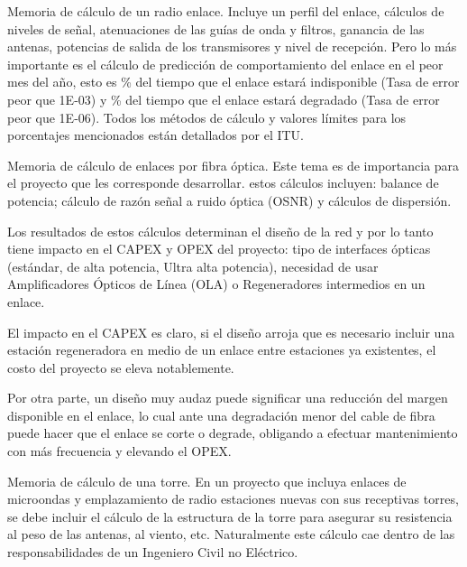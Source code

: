 Memoria de cálculo de un radio enlace. Incluye un perfil del enlace, cálculos de niveles 
de señal, atenuaciones de las guías de onda y filtros, ganancia de las antenas, 
potencias de salida de los transmisores y nivel de recepción. Pero lo más importante es 
el cálculo de predicción de comportamiento del enlace en el peor mes del año, esto es 
\% del tiempo que el enlace estará indisponible (Tasa de error peor que 1E-03) y \% del 
tiempo que el enlace estará degradado (Tasa de error peor que 1E-06). Todos los 
métodos de cálculo y valores límites para los porcentajes mencionados están 
detallados por el ITU. 
 
Memoria de cálculo de enlaces por fibra óptica. Este tema es de importancia para el 
proyecto que les corresponde desarrollar. estos cálculos incluyen: balance de potencia; 
cálculo de razón señal a ruido óptica (OSNR) y cálculos de dispersión. 
 
Los resultados de estos cálculos determinan el diseño de la red y por lo tanto tiene 
impacto en el CAPEX y OPEX del proyecto: tipo de interfaces ópticas (estándar, de alta 
potencia, Ultra alta potencia), necesidad de usar Amplificadores Ópticos de Línea 
(OLA) o Regeneradores intermedios en un enlace. 
 
El impacto en el CAPEX es claro, si el diseño arroja que es necesario incluir una 
estación regeneradora en medio de un enlace entre estaciones ya existentes, el costo 
del proyecto se eleva notablemente. 
 
Por otra parte, un diseño muy audaz puede significar una reducción del margen 
disponible en el enlace, lo cual ante una degradación menor del cable de fibra puede 
hacer que el enlace se corte o degrade, obligando a efectuar mantenimiento con más 
frecuencia y elevando el OPEX. 
 
Memoria de cálculo de una torre. En un proyecto que incluya enlaces de microondas y 
emplazamiento de radio estaciones nuevas con sus receptivas torres, se debe incluir el 
cálculo de la estructura de la torre para asegurar su resistencia al peso de las antenas, 
al viento, etc. Naturalmente este cálculo cae dentro de las responsabilidades de un 
Ingeniero Civil no Eléctrico. 

